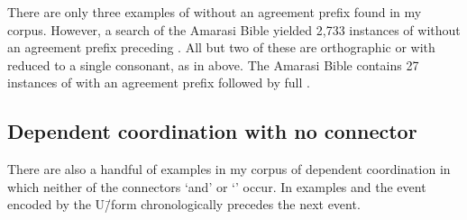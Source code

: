 \begin{exe}
	\label{ex:130921-1, 0.43-0.50}
		\begin{xlist}
		\end{xlist}
\end{exe}

There are only three examples of 
without an agreement prefix found in my corpus.
However, a search of the Amarasi Bible yielded 2,733
instances of  without an agreement prefix preceding .
All but two of these are orthographic 
or  with  reduced to a single consonant,
as in  above.
The Amarasi Bible contains 27 instances of 
with an agreement prefix followed by full .

\subsection{Dependent coordination with no connector}\label{sec:CooCon}
There are also a handful of examples in my corpus
of dependent coordination in which neither of the connectors
 `and' or  `' occur.
In examples  and 
the event encoded by the U\=/form chronologically precedes the next event.

